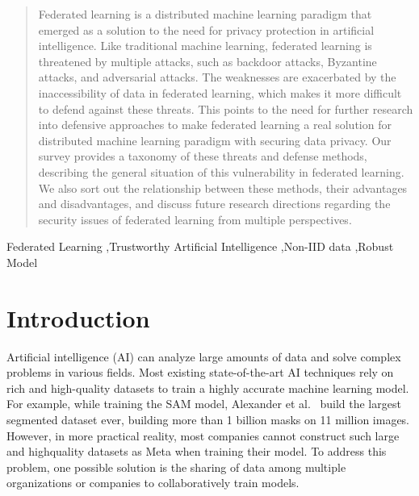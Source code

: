 \documentclass[a4paper,fleqn]{cas-dc}
\begin{document}
\begin{abstract}
	Federated learning is a distributed machine learning paradigm that emerged as a solution to the need for privacy
	protection in artificial intelligence. Like traditional machine
	learning, federated learning is threatened by multiple attacks,
	such as backdoor attacks,
	Byzantine attacks, and adversarial attacks. The weaknesses are
	exacerbated by the inaccessibility of data in federated learning,
	which makes it more diﬀicult to defend against these threats.
	This points to the need for further research into defensive
	approaches to make federated learning a real solution for distributed machine learning paradigm with securing data privacy.
	Our survey provides a taxonomy of these threats and defense
	methods, describing the general situation of this vulnerability
	in federated learning. We also sort out
	the relationship between these methods, their advantages and
	disadvantages, and discuss future research
	directions regarding the security issues of federated learning
	from multiple perspectives.
\end{abstract}







\begin{keywords}
Federated Learning \sep Trustworthy Artificial Intelligence \sep Non-IID data \sep Robust Model 
\end{keywords}


\maketitle


\section{Introduction}
Artificial intelligence (AI) can analyze large amounts
of data and solve complex problems in various fields.
Most existing state-of-the-art AI techniques rely on
rich and high-quality datasets to train a highly accurate
machine learning model. For example, while training
the SAM model, Alexander et al.~\cite{kirillov2023segment} build the largest
segmented dataset ever, building more than 1 billion
masks on 11 million images. However, in more practical reality,
most companies cannot construct such large and highquality datasets as Meta when training their model. To
address this problem, one possible solution is the sharing
of data among multiple organizations or companies to
collaboratively train models.
\end{document}
